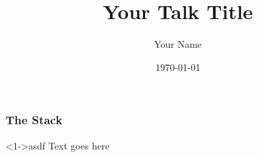 \documentclass{beamer}
\title{Your Talk Title}
\author{Your Name}
\institute{Wabash College}
\date{\today}
\begin{document}
\begin{frame}{}

\titlepage
	
\end{frame}



\begin{frame}{}
\frametitle{The Stack}

\begin{block}<1->{asdf}
Text goes here


\end{block}

	
\end{frame}
\end{document}
